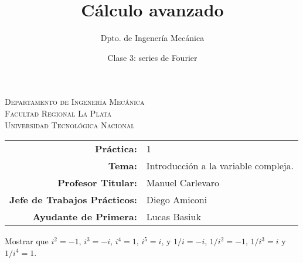 \documentclass[11pt]{article}
\title{Cálculo avanzado}
\author{Dpto. de Ingenería Mecánica}
\date{Clase 3: series de Fourier}
\begin{document}

\begin{center}
\end{center} 

\begin{center}
\vspace{\baselineskip}
\Large{\textsc{Departamento de Ingenería Mecánica}} \\
\textsc{Facultad Regional La Plata} \\
\textsc{Universidad Tecnológica Nacional}
\end{center}


\begin{center}
\begin{tabular}{r l}
    \textbf{Práctica:} & 1 \\
 \textbf{Tema:} & Introducción a la variable compleja. \\
 \textbf{Profesor Titular:} & Manuel Carlevaro \\
 \textbf{Jefe de Trabajos Prácticos:} & Diego Amiconi \\
 \textbf{Ayudante de Primera:} & Lucas Basiuk 
\end{tabular}\end{center}

\vspace{1em}

\begin{question} %
 Mostrar que $i^2 = -1$, $i^3 = -i$, $i^4 = 1$, $i^5 = i$, y $1/i = -i$, $1/i^2 = -1$, $1/i^3 = i$ y $1/i^4 = 1$.
\end{question}
\end{document}
